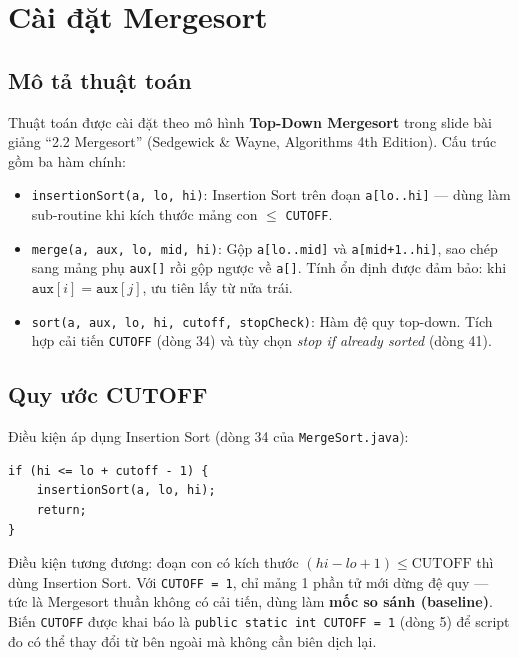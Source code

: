 \documentclass[12pt, a4paper]{article}
\begin{document}
\section{Cài đặt Mergesort}

\subsection{Mô tả thuật toán}

Thuật toán được cài đặt theo mô hình \textbf{Top-Down Mergesort} trong slide bài
giảng ``2.2 Mergesort'' (Sedgewick \& Wayne, Algorithms 4th Edition). Cấu trúc gồm
ba hàm chính:

\begin{itemize}
    \item \texttt{insertionSort(a, lo, hi)}: Insertion Sort trên đoạn \texttt{a[lo..hi]}
          — dùng làm sub-routine khi kích thước mảng con $\leq$ \texttt{CUTOFF}.
    \item \texttt{merge(a, aux, lo, mid, hi)}: Gộp \texttt{a[lo..mid]} và
          \texttt{a[mid+1..hi]}, sao chép sang mảng phụ \texttt{aux[]} rồi gộp
          ngược về \texttt{a[]}. Tính ổn định được đảm bảo: khi
          $\texttt{aux}[i] = \texttt{aux}[j]$, ưu tiên lấy từ nửa trái.
    \item \texttt{sort(a, aux, lo, hi, cutoff, stopCheck)}: Hàm đệ quy top-down.
          Tích hợp cải tiến \texttt{CUTOFF} (dòng 34) và tùy chọn
          \emph{stop if already sorted} (dòng 41).
\end{itemize}

\subsection{Quy ước CUTOFF}

Điều kiện áp dụng Insertion Sort (dòng 34 của \texttt{MergeSort.java}):

\begin{lstlisting}[caption={Điều kiện CUTOFF trong hàm sort() – MergeSort.java dòng 34.},
                   label={lst:cutoff}]
if (hi <= lo + cutoff - 1) {
    insertionSort(a, lo, hi);
    return;
}
\end{lstlisting}

Điều kiện tương đương: đoạn con có kích thước $(hi - lo + 1) \leq \text{CUTOFF}$
thì dùng Insertion Sort. Với \texttt{CUTOFF = 1}, chỉ mảng 1 phần tử mới dừng
đệ quy — tức là Mergesort thuần không có cải tiến, dùng làm \textbf{mốc so sánh
(baseline)}. Biến \texttt{CUTOFF} được khai báo là \texttt{public static int CUTOFF = 1}
(dòng 5) để script đo có thể thay đổi từ bên ngoài mà không cần biên dịch lại.
\end{document}
